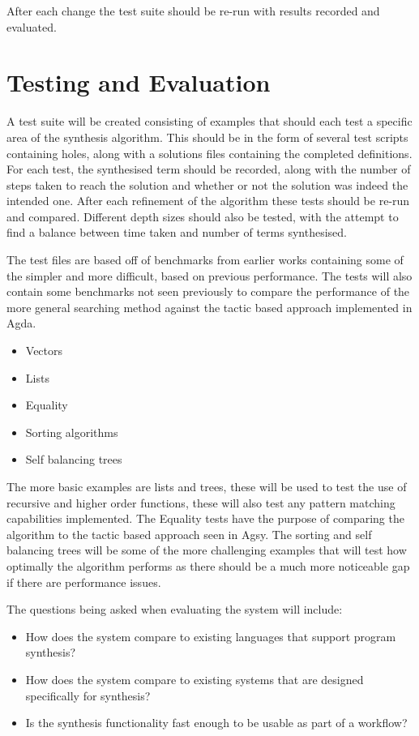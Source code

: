 \documentclass[a4paper]{article}
\begin{document}
After each change the test suite should be re-run with results recorded and evaluated.

\section{Testing and Evaluation}
\label{sec:org3463dff}

A test suite will be created consisting of examples that should each test a specific area of the synthesis algorithm. 
This should be in the form of several test scripts containing holes, along with a solutions files containing the 
completed definitions. For each test, the synthesised term should be recorded, along with the number of steps 
taken to reach the solution and whether or not the solution was indeed the intended one. After each refinement of the 
algorithm these tests should be re-run and compared. Different depth sizes should also be tested, with the attempt
to find a balance between time taken and number of terms synthesised.  

The test files are based off of benchmarks from earlier works containing some of the simpler and more 
difficult, based on previous performance. The tests will also contain some benchmarks not seen previously to compare the
performance of the more general searching method against the tactic based approach implemented in Agda.   

\begin{itemize}
\item Vectors
\item Lists
\item Equality
\item Sorting algorithms
\item Self balancing trees
\end{itemize}

The more basic examples are lists and trees, these will be used to test the use of recursive and higher order 
functions, these will also test any pattern matching capabilities implemented. The Equality tests have the purpose of 
comparing the algorithm to the tactic based approach seen in Agsy. The sorting and self balancing trees will be some of the 
more challenging examples that will test how optimally the algorithm performs as there should be a much more noticeable 
gap if there are performance issues. 

The questions being asked when evaluating the system will include: 

\begin{itemize}
\item How does the system compare to existing languages that support program synthesis?
\item How does the system compare to existing systems that are designed specifically for synthesis?
\item Is the synthesis functionality fast enough to be usable as part of a workflow?
\end{itemize}
\end{document}
